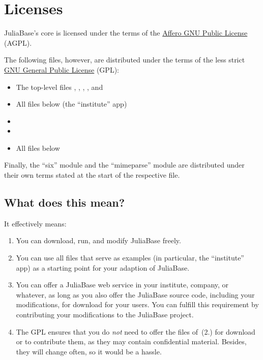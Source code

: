 \documentclass[a4paper,11pt,english]{sphinxmanual}
\begin{document}

\section{Licenses}
\label{project:licenses}\label{project:index-1}
JuliaBase's core is licensed under the terms of the \href{http://www.gnu.org/licenses/agpl-3.0.de.html}{Affero GNU Public
License} (AGPL).

The following files, however, are distributed under the terms of the less
strict \href{http://www.gnu.org/licenses/gpl-3.0.html}{GNU General Public License} (GPL):
\begin{itemize}
\item {} 
The top-level files , , ,
, and 

\item {} 
All files below  (the “institute” app)

\item {} 

\item {} 

\item {} 
All files below 

\end{itemize}

Finally, the “six” module and the “mimeparse” module are distributed under
their own terms stated at the start of the respective file.


\subsection{What does this mean?}
\label{project:what-does-this-mean}
It effectively means:
\begin{enumerate}
\item {} 
You can download, run, and modify JuliaBase freely.

\item {} 
You can use all files that serve as examples (in particular, the “institute”
app) as a starting point for your adaption of JuliaBase.

\item {} 
You can offer a JuliaBase web service in your institute, company, or
whatever, as long as you also offer the JuliaBase source code, including
your modifications, for download for your users.  You can fulfill this
requirement by contributing your modifications to the JuliaBase project.

\item {} 
The GPL ensures that you do \emph{not} need to offer the files of (2.) for
download or to contribute them, as they may contain confidential material.
Besides, they will change often, so it would be a hassle.

\end{enumerate}
\end{document}
